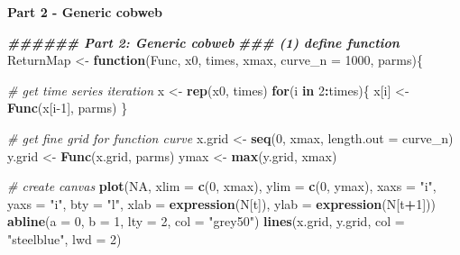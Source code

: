 \documentclass[
]{book}
\newenvironment{Shaded}{\begin{snugshade}}{\end{snugshade}}
\newcommand{\AttributeTok}[1]{\textcolor[rgb]{0.13,0.29,0.53}{#1}}
\newcommand{\CommentTok}[1]{\textcolor[rgb]{0.56,0.35,0.01}{\textit{#1}}}
\newcommand{\ConstantTok}[1]{\textcolor[rgb]{0.56,0.35,0.01}{#1}}
\newcommand{\ControlFlowTok}[1]{\textcolor[rgb]{0.13,0.29,0.53}{\textbf{#1}}}
\newcommand{\DecValTok}[1]{\textcolor[rgb]{0.00,0.00,0.81}{#1}}
\newcommand{\DocumentationTok}[1]{\textcolor[rgb]{0.56,0.35,0.01}{\textbf{\textit{#1}}}}
\newcommand{\FunctionTok}[1]{\textcolor[rgb]{0.13,0.29,0.53}{\textbf{#1}}}
\newcommand{\NormalTok}[1]{#1}
\newcommand{\OtherTok}[1]{\textcolor[rgb]{0.56,0.35,0.01}{#1}}
\newcommand{\SpecialCharTok}[1]{\textcolor[rgb]{0.81,0.36,0.00}{\textbf{#1}}}
\newcommand{\StringTok}[1]{\textcolor[rgb]{0.31,0.60,0.02}{#1}}
\begin{document}
\textbf{Part 2 - Generic cobweb}

\begin{Shaded}
\begin{Highlighting}[]
\DocumentationTok{\#\#\#\#\#\# Part 2: Generic cobweb}
\DocumentationTok{\#\#\# (1) define function}
\NormalTok{ReturnMap }\OtherTok{\textless{}{-}} \ControlFlowTok{function}\NormalTok{(Func, x0, times, xmax, }\AttributeTok{curve\_n =} \DecValTok{1000}\NormalTok{, parms)\{}
  
  \CommentTok{\# get time series iteration}
\NormalTok{  x }\OtherTok{\textless{}{-}} \FunctionTok{rep}\NormalTok{(x0, times)}
  \ControlFlowTok{for}\NormalTok{(i }\ControlFlowTok{in} \DecValTok{2}\SpecialCharTok{:}\NormalTok{times)\{}
\NormalTok{    x[i] }\OtherTok{\textless{}{-}} \FunctionTok{Func}\NormalTok{(x[i}\DecValTok{{-}1}\NormalTok{], parms)}
\NormalTok{  \}}
  
  \CommentTok{\# get fine grid for function curve}
\NormalTok{  x.grid }\OtherTok{\textless{}{-}} \FunctionTok{seq}\NormalTok{(}\DecValTok{0}\NormalTok{, xmax, }\AttributeTok{length.out =}\NormalTok{ curve\_n)}
\NormalTok{  y.grid }\OtherTok{\textless{}{-}} \FunctionTok{Func}\NormalTok{(x.grid, parms)}
\NormalTok{  ymax }\OtherTok{\textless{}{-}} \FunctionTok{max}\NormalTok{(y.grid, xmax)}
  
  \CommentTok{\# create canvas}
  \FunctionTok{plot}\NormalTok{(}\ConstantTok{NA}\NormalTok{, }\AttributeTok{xlim =} \FunctionTok{c}\NormalTok{(}\DecValTok{0}\NormalTok{, xmax), }\AttributeTok{ylim =} \FunctionTok{c}\NormalTok{(}\DecValTok{0}\NormalTok{, ymax), }\AttributeTok{xaxs =} \StringTok{"i"}\NormalTok{, }\AttributeTok{yaxs =} \StringTok{"i"}\NormalTok{, }\AttributeTok{bty =} \StringTok{"l"}\NormalTok{, }
       \AttributeTok{xlab =} \FunctionTok{expression}\NormalTok{(N[t]), }\AttributeTok{ylab =} \FunctionTok{expression}\NormalTok{(N[t}\SpecialCharTok{+}\DecValTok{1}\NormalTok{]))}
  \FunctionTok{abline}\NormalTok{(}\AttributeTok{a =} \DecValTok{0}\NormalTok{, }\AttributeTok{b =} \DecValTok{1}\NormalTok{, }\AttributeTok{lty =} \DecValTok{2}\NormalTok{, }\AttributeTok{col =} \StringTok{"grey50"}\NormalTok{)          }
  \FunctionTok{lines}\NormalTok{(x.grid, y.grid, }\AttributeTok{col =} \StringTok{"steelblue"}\NormalTok{, }\AttributeTok{lwd =} \DecValTok{2}\NormalTok{)      }
  

\end{Highlighting}
\end{Shaded}
\end{document}
